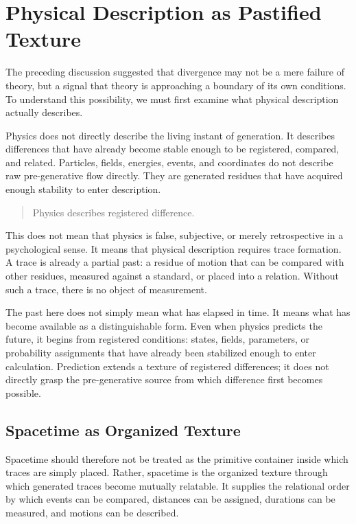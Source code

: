\section{Physical Description as Pastified Texture}

\label{sec:past}

The preceding discussion suggested that divergence may not be a mere
failure of theory,
but a signal that theory is approaching a boundary of its own
conditions.
To understand this possibility,
we must first examine what physical description actually describes.

Physics does not directly describe the living instant of generation.
It describes differences that have already become stable enough to be
registered,
compared,
and related.
Particles,
fields,
energies,
events,
and coordinates do not describe raw pre-generative flow directly.
They are generated residues that have acquired enough stability to
enter description.

\medskip
\begin{quote}
Physics describes registered difference.
\end{quote}
\medskip

This does not mean that physics is false,
subjective,
or merely retrospective in a psychological sense.
It means that physical description requires trace formation.
A trace is already a partial past:
a residue of motion that can be compared with other residues,
measured against a standard,
or placed into a relation.
Without such a trace,
there is no object of measurement.

The past here does not simply mean what has elapsed in time.
It means what has become available as a distinguishable form.
Even when physics predicts the future,
it begins from registered conditions:
states,
fields,
parameters,
or probability assignments that have already been stabilized enough to
enter calculation.
Prediction extends a texture of registered differences;
it does not directly grasp the pre-generative source from which
difference first becomes possible.

\subsection*{Spacetime as Organized Texture}

Spacetime should therefore not be treated as the primitive container
inside which traces are simply placed.
Rather,
spacetime is the organized texture through which generated traces
become mutually relatable.
It supplies the relational order by which events can be compared,
distances can be assigned,
durations can be measured,
and motions can be described.

